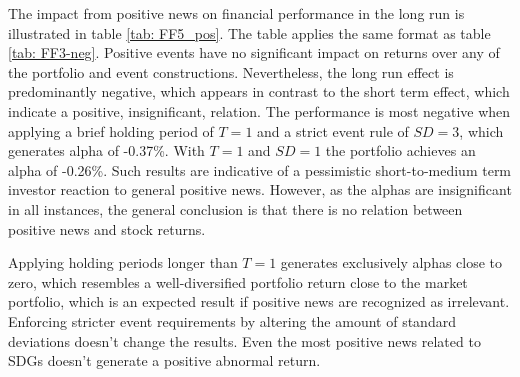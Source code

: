 The impact from positive news on financial performance in the long run is illustrated in table \ref{tab: FF5_pos}. The table applies the same format as table \ref{tab: FF3-neg}. Positive events have no significant impact on returns over any of the portfolio and event constructions. Nevertheless, the long run effect is predominantly negative, which appears in contrast to the short term effect, which indicate a positive, insignificant, relation. The performance is most negative when applying a brief holding period of $T=1$ and a strict event rule of $SD = 3$, which generates alpha of -0.37\%. With $T=1$ and $SD=1$ the portfolio achieves an alpha of -0.26\%.   
Such results are indicative of a pessimistic short-to-medium term investor reaction to general positive news. However, as the alphas are insignificant in all instances, the general conclusion is that there is no relation between positive news and stock returns.  

Applying holding periods longer than $T=1$ generates exclusively alphas close to zero, which resembles a well-diversified portfolio return close to the market portfolio, which is an expected result if positive news are recognized as irrelevant. Enforcing stricter event requirements by altering the amount of standard deviations doesn't change the results. Even the most positive news related to SDGs doesn't generate a positive abnormal return. 


